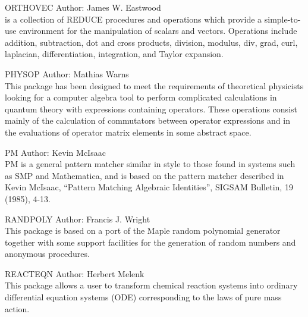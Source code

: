 \begin{Package}{ORTHOVEC}
Author: James W. Eastwood\\

 is a collection of REDUCE procedures and operations which
provide a simple-to-use environment for the manipulation of scalars and
vectors.  Operations include addition, subtraction, dot and cross
products, division, modulus, div, grad, curl, laplacian, differentiation,
integration, and Taylor expansion.
\end{Package}

\begin{Package}{PHYSOP}
Author: Mathias Warns\\

This package has been designed to meet the requirements of theoretical
physicists looking for a computer algebra tool to perform complicated
calculations in quantum theory with expressions containing operators.
These operations consist mainly of the calculation of commutators between
operator expressions and in the evaluations of operator matrix elements in
some abstract space.
\end{Package}

\begin{Package}{PM}
Author: Kevin McIsaac\\

PM is a general pattern matcher similar in style to those found in systems
such as SMP and Mathematica, and is based on the pattern matcher described
in Kevin McIsaac, ``Pattern Matching Algebraic Identities'', SIGSAM Bulletin,
19 (1985), 4-13.
\end{Package}

\begin{Package}{RANDPOLY}
Author: Francis J. Wright\\

This package is based on a port of the Maple random polynomial
generator together with some support facilities for the generation
of random numbers and anonymous procedures.
\end{Package}

\begin{Package}{REACTEQN}
Author: Herbert Melenk\\

This package allows a user to transform chemical reaction systems into
ordinary differential equation systems (ODE) corresponding to the laws of
pure mass action.
\end{Package}

